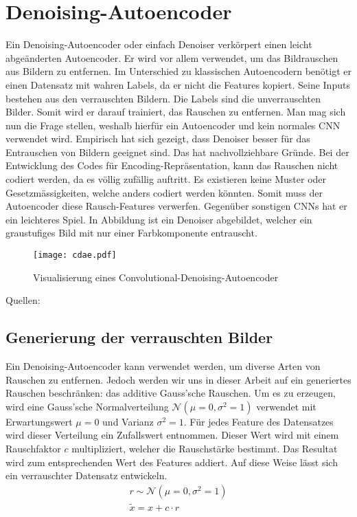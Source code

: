 \section{Denoising-Autoencoder}
Ein Denoising-Autoencoder oder einfach Denoiser verkörpert einen leicht abgeänderten
Autoencoder. Er wird vor allem verwendet, um das Bildrauschen aus Bildern zu entfernen.
\para{}
Im Unterschied zu klassischen Autoencodern benötigt er einen Datensatz mit
wahren Labels, da er nicht die Features kopiert.
Seine Inputs bestehen aus den verrauschten Bildern. Die Labels sind die
unverrauschten Bilder. Somit wird er darauf trainiert, das Rauschen zu entfernen.
Man mag sich nun die Frage stellen, weshalb hierfür ein Autoencoder und
kein normales CNN verwendet wird. Empirisch hat sich gezeigt, dass
Denoiser besser für das Entrauschen von Bildern geeignet sind.
Das hat nachvollziehbare Gründe. Bei der
Entwicklung des Codes für Encoding-Repräsentation, kann das Rauschen nicht
codiert werden, da es völlig zufällig auftritt. Es existieren keine Muster oder
Gesetzmässigkeiten, welche anders codiert werden könnten. Somit muss der
Autoencoder diese Rausch-Features verwerfen. Gegenüber sonstigen CNNs hat er ein leichteres Spiel.
\para{}
In Abbildung  ist ein Denoiser abgebildet, welcher ein
graustufiges Bild mit nur einer Farbkomponente entrauscht.
\para{}
\begin{figure}[h!]
  \centering
  \texttt{[image: cdae.pdf]}
  \caption{Visualisierung eines Convolutional-Denoising-Autoencoder}
  \label{fig:denoiser}
\end{figure}
\para{}
Quellen: \cite{paper:denoiser}

\subsection{Generierung der verrauschten Bilder}
Ein Denoising-Autoencoder kann verwendet werden, um diverse Arten von
Rauschen zu entfernen. Jedoch werden wir uns in dieser Arbeit auf ein
generiertes Rauschen beschränken: das additive Gauss'sche Rauschen.
Um es zu erzeugen, wird eine Gauss'sche Normalverteilung
$\mathcal{N}(\mu = 0, \sigma^2 = 1)$ verwendet mit Erwartungswert $\mu = 0$ und Varianz
$\sigma^2 = 1$. Für jedes Feature des Datensatzes wird dieser Verteilung ein
Zufallswert entnommen. Dieser Wert wird mit einem Rauschfaktor $c$
multipliziert, welcher die Rauschstärke bestimmt. Das Resultat wird zum
entsprechenden Wert des Features addiert.
Auf diese Weise lässt sich ein verrauschter Datensatz entwickeln.
\begin{gather*}
  r \sim \mathcal{N}(\mu = 0, \sigma^2 = 1) \\
  \tilde{x} = x + c \cdot r
\end{gather*}

